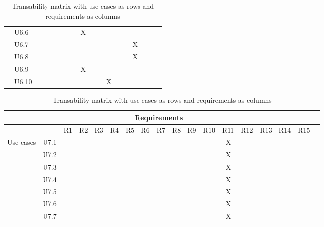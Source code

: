 \documentclass[hidelinks, 12pt, a4paper]{article}
\begin{document}
\begin{table}[H]
\begin{tabular}{|l|l|l|c|c|c|c|c|c|c|c|c|c|c|c|c|c|c|}
             & U6.6  &    &    &    &    &    &    & X  &    &    &     &     &     &     &     &     \\ \cline{2-17}
             & U6.7  &    &    &    &    &    &    &    &    &    &     &     &     & X   &     &     \\ \cline{2-17}
             & U6.8  &    &    &    &    &    &    &    &    &    &     &     &     & X   &     &     \\ \cline{2-17}
             & U6.9  &    &    &    &    &    &    & X  &    &    &     &     &     &     &     &     \\ \cline{2-17}
             & U6.10 &    &    &    &    &    &    &    &    &    & X   &     &     &     &     &     \\ \cline{1-17}
      \end{tabular}
      \vspace{0.2cm}
      \caption{Transability matrix with use cases as rows and requirements as columns}
      \label{table:ContinuedCould-haveRequirementsTraceabilityMatrix}
\end{table}
\newpage
\begin{table}[H]
      \centering
      \begin{tabular}{|l|l|l|c|c|c|c|c|c|c|c|c|c|c|c|c|c|c|}
            \hline

            \multicolumn{17}{|c|}{Requirements}                                                      \\ \hline
             &      & R1 & R2 & R3 & R4 & R5 & R6 & R7 & R8 & R9 & R10 & R11 & R12 & R13 & R14 & R15 \\ \hline
            \multirow{7}{*}{Use cases}

             & U7.1 &    &    &    &    &    &    &    &    &    &     & X   &     &     &     &     \\ \cline{2-17}
             & U7.2 &    &    &    &    &    &    &    &    &    &     & X   &     &     &     &     \\ \cline{2-17}
             & U7.3 &    &    &    &    &    &    &    &    &    &     & X   &     &     &     &     \\ \cline{2-17}
             & U7.4 &    &    &    &    &    &    &    &    &    &     & X   &     &     &     &     \\ \cline{2-17}
             & U7.5 &    &    &    &    &    &    &    &    &    &     & X   &     &     &     &     \\ \cline{2-17}
             & U7.6 &    &    &    &    &    &    &    &    &    &     & X   &     &     &     &     \\ \cline{2-17}
             & U7.7 &    &    &    &    &    &    &    &    &    &     & X   &     &     &     &     \\ \cline{1-17}
      \end{tabular}
      \vspace{1cm}
      \caption{Transability matrix with use cases as rows and requirements as columns}
      \label{table:ContinuedCould-haveRequirementsTraceabilityMatrix}
\end{table}
\newpage
\end{document}
